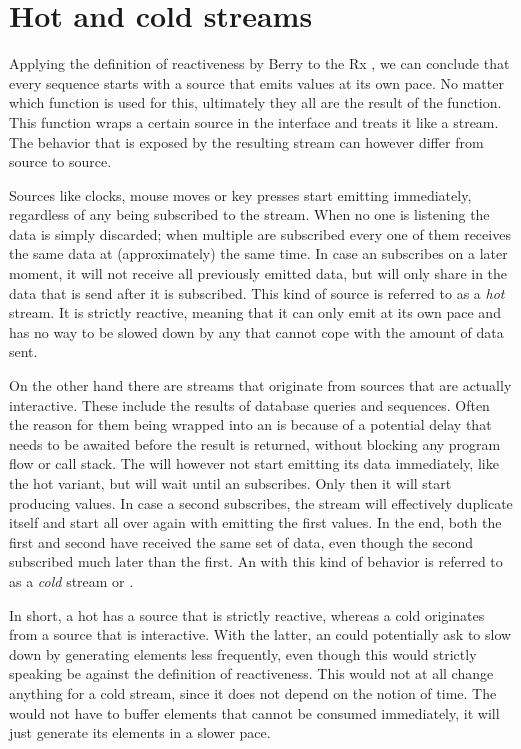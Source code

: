 \section{Hot and cold streams}
Applying the definition of reactiveness by Berry\cite{berry1991-Reactive} to the Rx \obs, we can conclude that every \obs sequence starts with a source that emits values at its own pace. No matter which function is used for this, ultimately they all are the result of the  function. This function wraps a certain source in the \obs interface and treats it like a stream. The behavior that is exposed by the resulting stream can however differ from source to source.

Sources like clocks, mouse moves or key presses start emitting immediately, regardless of any \obv being subscribed to the stream. When no one is listening the data is simply discarded; when multiple \obv are subscribed every one of them receives the same data at (approximately) the same time. In case an \obv subscribes on a later moment, it will not receive all previously emitted data, but will only share in the data that is send after it is subscribed. This kind of source is referred to as a \textit{hot} stream. It is strictly reactive, meaning that it can only emit at its own pace and has no way to be slowed down by any \obv that cannot cope with the amount of data sent.

On the other hand there are streams that originate from sources that are actually interactive. These include the results of database queries and \itb sequences. Often the reason for them being wrapped into an \obs is because of a potential delay that needs to be awaited before the result is returned, without blocking any program flow or call stack. The \obs will however not start emitting its data immediately, like the hot variant, but will wait until an \obv subscribes. Only then it will start producing values. In case a second \obv subscribes, the stream will effectively duplicate itself and start all over again with emitting the first values. In the end, both the first and second \obv have received the same set of data, even though the second subscribed much later than the first. An \obs with this kind of behavior is referred to as a \textit{cold} stream or \obs.

In short, a hot \obs has a source that is strictly reactive, whereas a cold \obs originates from a source that is interactive. With the latter, an \obv could potentially ask to slow down by generating elements less frequently, even though this would strictly speaking be against the definition of reactiveness. This would not at all change anything for a cold stream, since it does not depend on the notion of time. The \obs would not have to buffer elements that cannot be consumed immediately, it will just generate its elements in a slower pace.

